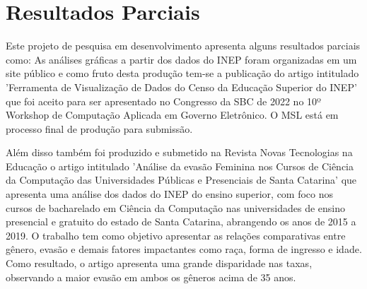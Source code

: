 \section{Resultados Parciais}\label{sec:ResultadosParciais}
 Este projeto de pesquisa em desenvolvimento apresenta alguns resultados parciais como:
 As análises gráficas a partir dos dados do INEP foram organizadas em um site público e como fruto desta produção tem-se a publicação do artigo intitulado 'Ferramenta de Visualização de Dados do Censo da Educação Superior do INEP' que foi aceito para ser apresentado no Congresso da SBC de 2022 no 10º Workshop de Computação Aplicada em Governo Eletrônico. O MSL está em processo final de produção para submissão.

Além disso também foi produzido e submetido na Revista Novas Tecnologias na Educação o artigo intitulado 'Análise da evasão Feminina nos Cursos de Ciência da Computação das Universidades Públicas e Presenciais de Santa Catarina' que apresenta uma análise dos dados do INEP do ensino superior, com foco nos cursos de bacharelado em Ciência
da Computação nas universidades de ensino presencial e gratuito do estado de Santa Catarina, abrangendo os anos de 2015 a 2019. O trabalho tem como
objetivo apresentar as relações comparativas entre gênero, evasão e demais fatores impactantes como raça, forma de ingresso e idade. Como resultado, o artigo apresenta uma grande disparidade nas taxas, observando a maior evasão em ambos os gêneros acima de 35 anos.
